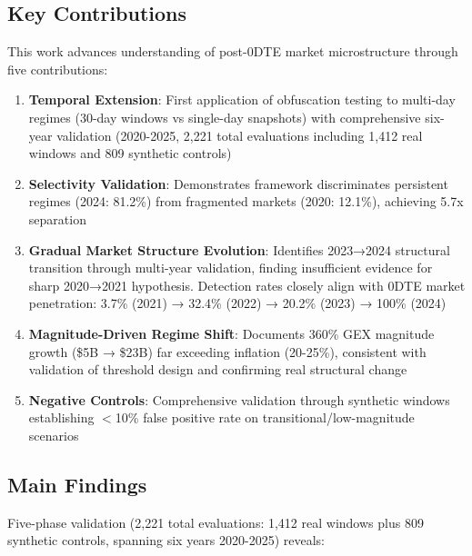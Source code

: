 \subsection{Key Contributions}

This work advances understanding of post-0DTE market microstructure through five contributions:

\begin{enumerate}
\item \textbf{Temporal Extension}: First application of obfuscation testing to multi-day regimes (30-day windows vs single-day snapshots) with comprehensive six-year validation (2020-2025, 2,221 total evaluations including 1,412 real windows and 809 synthetic controls)
\item \textbf{Selectivity Validation}: Demonstrates framework discriminates persistent regimes (2024: 81.2\%) from fragmented markets (2020: 12.1\%), achieving 5.7x separation
\item \textbf{Gradual Market Structure Evolution}: Identifies 2023→2024 structural transition through multi-year validation, finding insufficient evidence for sharp 2020→2021 hypothesis. Detection rates closely align with 0DTE market penetration: 3.7\% (2021) → 32.4\% (2022) → 20.2\% (2023) → 100\% (2024)
\item \textbf{Magnitude-Driven Regime Shift}: Documents 360\% GEX magnitude growth (\$5B → \$23B) far exceeding inflation (20-25\%), consistent with validation of threshold design and confirming real structural change
\item \textbf{Negative Controls}: Comprehensive validation through synthetic windows establishing $<$10\% false positive rate on transitional/low-magnitude scenarios
\end{enumerate}

\subsection{Main Findings}

Five-phase validation (2,221 total evaluations: 1,412 real windows plus 809 synthetic controls, spanning six years 2020-2025) reveals:

